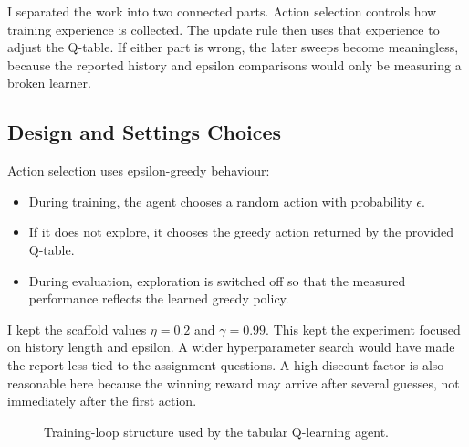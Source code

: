 \documentclass[11pt,a4paper]{article}
\begin{document}
I separated the work into two connected parts. Action selection controls how training experience is collected. The update rule then uses that experience to adjust the Q-table. If either part is wrong, the later sweeps become meaningless, because the reported history and epsilon comparisons would only be measuring a broken learner.

\subsection{Design and Settings Choices}

Action selection uses epsilon-greedy behaviour:

\begin{itemize}[leftmargin=1.5em]
  \item During training, the agent chooses a random action with probability $\epsilon$.
  \item If it does not explore, it chooses the greedy action returned by the provided Q-table.
  \item During evaluation, exploration is switched off so that the measured performance reflects the learned greedy policy.
\end{itemize}

I kept the scaffold values $\eta = 0.2$ and $\gamma = 0.99$. This kept the experiment focused on history length and epsilon. A wider hyperparameter search would have made the report less tied to the assignment questions. A high discount factor is also reasonable here because the winning reward may arrive after several guesses, not immediately after the first action.

\begin{figure}[H]
\centering
{}
\caption{Training-loop structure used by the tabular Q-learning agent.}
\label{fig:qlearning-loop}
\end{figure}
\end{document}
